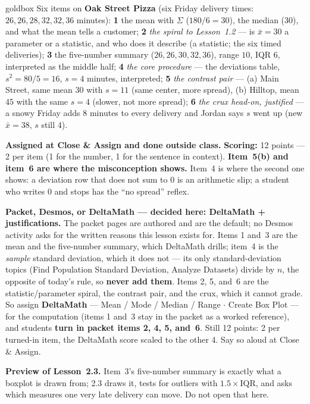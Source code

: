 \documentclass[10pt]{article}
\begin{document}
\boxguard
\begin{skillbox}{goldbox}
Six items on \textbf{Oak Street Pizza} (six Friday delivery times: $26, 26, 28, 32, 32, 36$
minutes): \textbf{1} the mean with $\Sigma$ ($180/6 = 30$), the median ($30$), and what the mean
tells a customer; \textbf{2} \emph{the spiral to Lesson~1.2} --- is $\bar{x} = 30$ a parameter or a
statistic, and who does it describe (a statistic; the six timed deliveries); \textbf{3} the
five-number summary ($26, 26, 30, 32, 36$), range $10$, IQR $6$, interpreted as the middle half;
\textbf{4} \emph{the core procedure} --- the deviations table, $s^2 = 80/5 = 16$, $s = 4$ minutes,
interpreted; \textbf{5} \emph{the contrast pair} --- (a) Main Street, same mean $30$ with $s = 11$
(same center, more spread), (b) Hilltop, mean $45$ with the same $s = 4$ (slower, not more
spread); \textbf{6} \emph{the crux head-on, justified} --- a snowy Friday adds $8$ minutes to every
delivery and Jordan says $s$ went up (new $\bar{x} = 38$, $s$ still $4$).

\textbf{Assigned at Close \& Assign and done outside class.} \textbf{Scoring:} 12 points --- 2
per item (1 for the number, 1 for the sentence in context). \textbf{Item~5(b) and item~6 are where
the misconception shows.} Item~4 is where the second one shows: a deviation row that does not
sum to $0$ is an arithmetic slip; a student who writes $0$ and stops has the ``no spread''
reflex.

\textbf{Packet, Desmos, or DeltaMath --- decided here: DeltaMath + justifications.} The packet
pages are authored and are the default; no Desmos activity asks for the written reasons this
lesson exists for. Items 1 and~3 are the mean and the five-number summary, which DeltaMath
drills; item~4 is the \emph{sample} standard deviation, which it does not --- its only
standard-deviation topics (Find Population Standard Deviation, Analyze Datasets) divide by $n$,
the opposite of today's rule, so \textbf{never add them}. Items 2, 5, and~6 are the
statistic/parameter spiral, the contrast pair, and the crux, which it cannot grade. So assign
\textbf{DeltaMath} --- Mean / Mode / Median / Range $\cdot$ Create Box Plot --- for the
computation (items 1 and~3 stay in the packet as a worked reference), and students \textbf{turn
in packet items 2, 4, 5, and~6}. Still 12 points: 2 per turned-in item, the DeltaMath score
scaled to the other 4. Say so aloud at Close \& Assign.

\textbf{Preview of Lesson~2.3.} Item~3's five-number summary is exactly what a boxplot is drawn
from; 2.3 draws it, tests for outliers with $1.5 \times \text{IQR}$, and asks which measures one
very late delivery can move. Do not open that here.


\end{skillbox}
\end{document}
